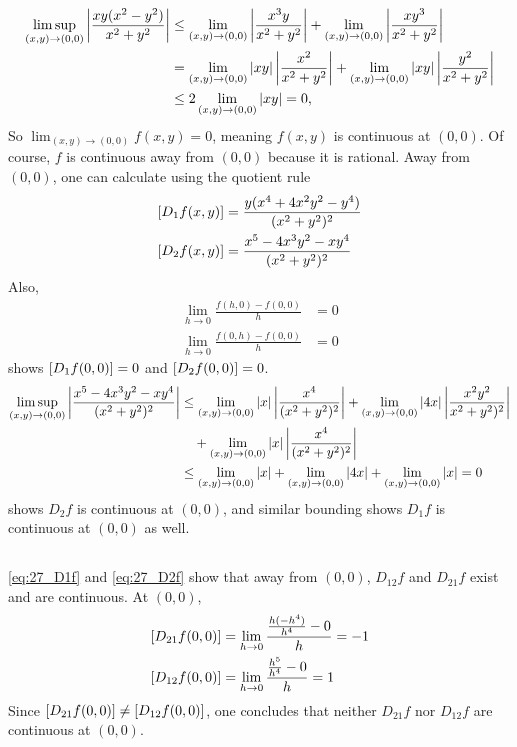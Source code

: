 \documentclass[12pt]{article}
\begin{document}
\subsection{} 
\begin{align*}
  \limsup_{(x, y) \rightarrow (0, 0)} \left|\frac{xy(x^2 - y^2)}{x^2 + y^2}\right|
  & \leq \lim_{(x, y) \rightarrow (0, 0)} \left|\frac{x^3 y}{x^2 + y^2}\right| + \lim_{(x, y) \rightarrow (0, 0)} \left|\frac{xy^3}{x^2 + y^2}\right| \\ 
  & = \lim_{(x, y) \rightarrow (0, 0)} \left|xy\right|\left|\frac{x^2}{x^2 + y^2}\right| + \lim_{(x, y) \rightarrow (0, 0)} \left|xy\right|\left|\frac{y^2}{x^2 + y^2}\right| \\ 
  & \leq 2 \lim_{(x,y ) \rightarrow (0, 0)} \left|xy\right| = 0,
\end{align*}
So $\lim_{(x, y) \rightarrow (0, 0)} f(x, y) = 0$, meaning $f(x, y)$ is continuous at $(0, 0)$. 
Of course, $f$ is continuous away from $(0, 0)$ because it is rational.  
Away from $(0, 0)$, one can calculate using the quotient rule
\begin{align}
  \Djf{1}{f}{x, y} & = \frac{y(x^4 + 4x^2 y^2 -y^4)}{(x^2 + y^2)^2} \label{eq:27_D1f} \\ 
  \Djf{2}{f}{x, y} & = \frac{x^5 - 4x^3 y^2 - xy^4}{(x^2 + y^2)^2} \label{eq:27_D2f}
\end{align}
Also, 
\begin{align*}
  \lim_{h \rightarrow 0} \frac{f(h, 0) - f(0, 0)}{h} & = 0 \\  
  \lim_{h \rightarrow 0} \frac{f(0, h) - f(0, 0)}{h} & = 0
\end{align*}
shows $[D_{1}f(0, 0)] = 0$ and $[D_{2}f(0, 0)] = 0$. 
\begin{align*}
\limsup_{(x, y) \rightarrow (0, 0)} \left|\frac{x^5 - 4x^3 y^2 - xy^4}{(x^2 + y^2)^2}\right|
  & \leq \lim_{(x, y) \rightarrow (0, 0)} \left|x\right|\left|\frac{x^4}{(x^2 + y^2)^2}\right| + \lim_{(x, y) \rightarrow (0, 0)} \left|4x\right|\left|\frac{x^2 y^2}{x^2 + y^2)^2}\right| \\ 
  &  \quad + \lim_{(x, y) \rightarrow (0, 0)} \left|x\right|\left|\frac{x^4}{(x^2 + y^2)^2}\right| \\ 
  & \leq \lim_{(x, y) \rightarrow (0, 0)} \left|x\right| + \lim_{(x, y) \rightarrow (0, 0)} \left|4x\right| + \lim_{(x, y) \rightarrow (0, 0)} \left|x\right| = 0
\end{align*}
shows $D_{2}f$ is continuous at $(0, 0)$, and similar bounding shows $D_{1}f$ is continuous at $(0, 0)$ as well. 

\subsection{} 
\eqref{eq:27_D1f} and \eqref{eq:27_D2f} show that away from $(0, 0)$, $D_{12}f$ and $D_{21}f$ exist and are continuous. 
At $(0, 0)$,
\begin{align*}
  \Djf{21}{f}{0, 0} & = \lim_{h \rightarrow 0} \frac{\frac{h(-h^4)}{h^4} - 0}{h} = -1 \\ 
  \Djf{12}{f}{0, 0} & = \lim_{h \rightarrow 0} \frac{\frac{h^5}{h^4} - 0}{h} = 1
\end{align*}
Since $[D_{21}f(0, 0)] \neq [D_{12}f(0, 0)]$, one concludes that neither $D_{21}f$ nor $D_{12}f$ are continuous at $(0, 0)$. 
\end{document}
